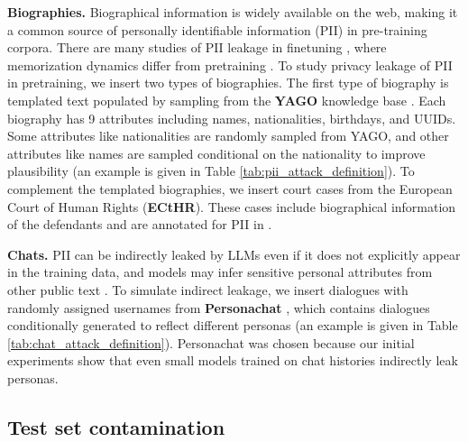 \textbf{Biographies.} Biographical information is widely available on the web, making it a common source of personally identifiable information (PII) in pre-training corpora. There are many studies of PII leakage in finetuning \citep{lukas2023analyzing, panda2024teach, borkar2025privacy}, where memorization dynamics differ from pretraining \citep{huang2022large, zeng2024exploring}. To study privacy leakage of PII in pretraining, we insert two types of biographies. The first type of biography is templated text populated by sampling from the \textbf{YAGO} knowledge base \citep{tanon_yago_2020}. Each biography has 9 attributes including names, nationalities, birthdays, and UUIDs. Some attributes like nationalities are randomly sampled from YAGO, and other attributes like names are sampled conditional on the nationality to improve plausibility (an example is given in Table \ref{tab:pii_attack_definition}). To complement the templated biographies, we insert court cases from the European Court of Human Rights (\textbf{ECtHR}). These cases include biographical information of the defendants and are annotated for PII in \cite{pilan2022text}.

\textbf{Chats.} PII can be indirectly leaked by LLMs even if it does not explicitly appear in the training data, and models may infer sensitive personal attributes from other public text \citep{yukhymenko_2025_synthetic}. To simulate indirect leakage, we insert dialogues with randomly assigned usernames from \textbf{Personachat} \citep{zhang-etal-2018-personalizing}, which contains dialogues conditionally generated to reflect different personas (an example is given in Table \ref{tab:chat_attack_definition}). Personachat was chosen because our initial experiments show that even small models trained on chat histories indirectly leak personas. 

\subsection{Test set contamination}

